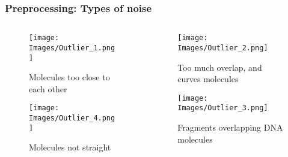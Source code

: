 \documentclass[10pt,dvipsnames,table]{beamer}
\begin{document}
\begin{frame}
\frametitle{Preprocessing: Types of noise}
\begin{columns}[t]
\begin{column}{0.6\textwidth}
\begin{figure}[H]
\begin{center}
\texttt{[image: Images/Outlier\_1.png]}
\end{center}
\caption{Molecules too close to each other}
\end{figure}

\begin{figure}[H]
\begin{center}
\texttt{[image: Images/Outlier\_4.png]}
\end{center}
\caption{Molecules not straight}
\end{figure}

\end{column}
\begin{column}{0.4\textwidth}
\begin{figure}[H]
\begin{center}
\texttt{[image: Images/Outlier\_2.png]}
\end{center}
\caption{Too much overlap, and curves molecules}
\end{figure}

\begin{figure}[H]
\begin{center}
\texttt{[image: Images/Outlier\_3.png]}
\end{center}
\caption{Fragments overlapping DNA molecules}
\end{figure}
\end{column}

\end{columns}
\end{frame}
\end{document}

